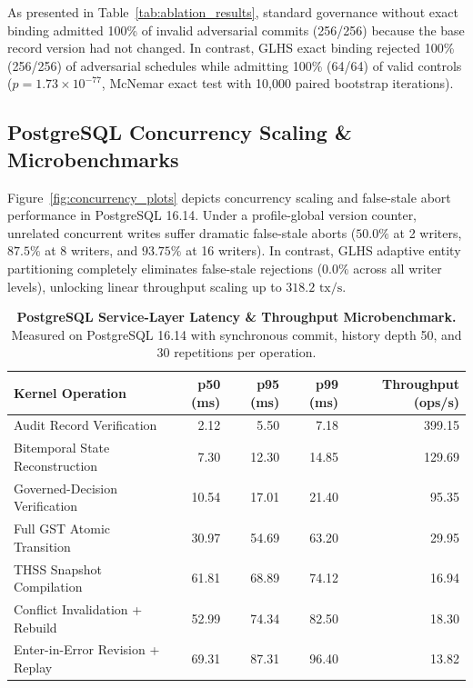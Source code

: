 \documentclass[11pt,a4paper]{article}
\begin{document}
As presented in Table~\ref{tab:ablation_results}, standard governance without exact binding admitted 100\% of invalid adversarial commits (256/256) because the base record version had not changed. In contrast, GLHS exact binding rejected 100\% (256/256) of adversarial schedules while admitting 100\% (64/64) of valid controls ($p = 1.73 \times 10^{-77}$, McNemar exact test with 10,000 paired bootstrap iterations).

\subsection{PostgreSQL Concurrency Scaling \& Microbenchmarks}
Figure~\ref{fig:concurrency_plots} depicts concurrency scaling and false-stale abort performance in PostgreSQL 16.14. Under a profile-global version counter, unrelated concurrent writes suffer dramatic false-stale aborts ($50.0\%$ at 2 writers, $87.5\%$ at 8 writers, and $93.75\%$ at 16 writers). In contrast, GLHS adaptive entity partitioning completely eliminates false-stale rejections ($0.0\%$ across all writer levels), unlocking linear throughput scaling up to $318.2\text{ tx/s}$.

\begin{table}[H]
\centering
\small
\caption{\textbf{PostgreSQL Service-Layer Latency \& Throughput Microbenchmark.} Measured on PostgreSQL 16.14 with synchronous commit, history depth 50, and 30 repetitions per operation.}
\label{tab:perf_detailed}
\begin{tabular}{lrrrr}
\toprule
\textbf{Kernel Operation} & \textbf{p50 (ms)} & \textbf{p95 (ms)} & \textbf{p99 (ms)} & \textbf{Throughput (ops/s)}\\
\midrule
Audit Record Verification & 2.12 & 5.50 & 7.18 & 399.15\\
Bitemporal State Reconstruction & 7.30 & 12.30 & 14.85 & 129.69\\
Governed-Decision Verification & 10.54 & 17.01 & 21.40 & 95.35\\
Full GST Atomic Transition & 30.97 & 54.69 & 63.20 & 29.95\\
THSS Snapshot Compilation & 61.81 & 68.89 & 74.12 & 16.94\\
Conflict Invalidation + Rebuild & 52.99 & 74.34 & 82.50 & 18.30\\
Enter-in-Error Revision + Replay & 69.31 & 87.31 & 96.40 & 13.82\\
\bottomrule
\end{tabular}
\end{table}
\end{document}
